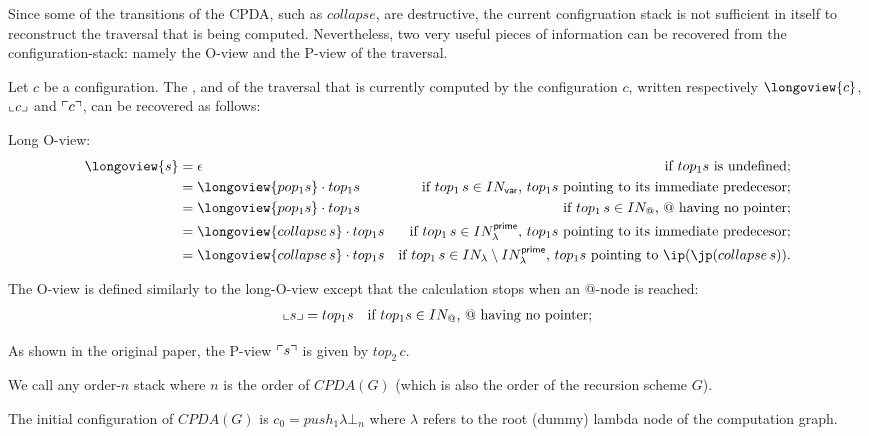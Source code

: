 \documentclass[a4paper]{article}
\theoremstyle{remark}
\theoremstyle{definition}
\newcommand\INodes{IN}%
\begin{document}
Since some of the transitions of the CPDA, such as $collapse$, are destructive, the current configruation stack
is not sufficient in itself to reconstruct the traversal that is being computed.
Nevertheless, two very useful pieces of information can be recovered from the configuration-stack: namely the O-view and the P-view of the traversal.

Let $c$ be a configuration. The ,
 and  of the traversal that is currently computed by the configuration $c$, written respectively $\longoview{c}$, $\llcorner c \lrcorner$ and $\ulcorner c \urcorner$, can be recovered as follows:
\begin{compactitem}
\item Long O-view:
\begin{align*}
  \longoview{s} &= \epsilon & \mbox{if $top_1 s$ is undefined;} \\
      &=   \longoview{pop_1 s} \cdot top_1 s & \mbox{if $top_1\,s \in \INodes_{\sf var}$, $top_1 s$ pointing to its immediate predecesor;} \\
      &=   \longoview{pop_1 s} \cdot top_1 s & \mbox{if $top_1\,s \in \INodes_@$, $@$ having no pointer;} \\
      &=   \longoview{collapse\,s} \cdot top_1 s & \mbox{if $top_1\,s \in \INodes_\lambda^{\sf prime}$, $top_1 s$ pointing to its immediate predecesor;} \\
      &=   \longoview{collapse\,s} \cdot top_1 s & \mbox{if $top_1\,s \in \INodes_\lambda\setminus \INodes_\lambda^{\sf prime}$, $top_1 s$ pointing to $\ip(\jp(collapse\,s))$.} \\
\end{align*}
\item The O-view is defined similarly to the long-O-view except that the calculation stops when an @-node is reached:
\begin{align*}
  \oview{s}  &=   top_1 s & \mbox{if $top_1 s \in \INodes_@$, $@$ having no pointer;}
\end{align*}
\item As shown in the original paper, the P-view $\ulcorner s \urcorner$ is given by $top_2\,c$.
\end{compactitem}
\bigskip

We call  any order-$n$ stack where $n$ is the order
of $CPDA(G)$ (which is also the order of the recursion scheme $G$).

The initial configuration of $CPDA(G)$ is $c_0 = push_1 \lambda \bot_n$
where $\lambda$ refers to the root (dummy) lambda node of the computation graph.
\end{document}
